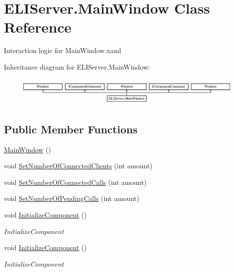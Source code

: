 \hypertarget{class_e_l_i_server_1_1_main_window}{}\section{E\+L\+I\+Server.\+Main\+Window Class Reference}
\label{class_e_l_i_server_1_1_main_window}


Interaction logic for Main\+Window.\+xaml  


Inheritance diagram for E\+L\+I\+Server.\+Main\+Window\+:\begin{figure}[H]
\begin{center}
\leavevmode
\includegraphics[height=1.464052cm]{d4/da4/class_e_l_i_server_1_1_main_window}
\end{center}
\end{figure}
\subsection*{Public Member Functions}
\begin{DoxyCompactItemize}
\item 
\hyperlink{class_e_l_i_server_1_1_main_window_ae50bb438e117f698b08e123aac01202b}{Main\+Window} ()
\item 
void \hyperlink{class_e_l_i_server_1_1_main_window_a103118ab2c9111954bc71bdfb168a3b6}{Set\+Number\+Of\+Connected\+Clients} (int amount)
\item 
void \hyperlink{class_e_l_i_server_1_1_main_window_a3910e3bdac410230d13aa22194f5e866}{Set\+Number\+Of\+Connected\+Calls} (int amount)
\item 
void \hyperlink{class_e_l_i_server_1_1_main_window_a8240badcee2def96a0b76ab95ea35ac6}{Set\+Number\+Of\+Pending\+Calls} (int amount)
\item 
void \hyperlink{class_e_l_i_server_1_1_main_window_a875637e4f56cfe224a61ef220213e1a0}{Initialize\+Component} ()
\begin{DoxyCompactList}\small\item\em Initialize\+Component \end{DoxyCompactList}\item 
void \hyperlink{class_e_l_i_server_1_1_main_window_a875637e4f56cfe224a61ef220213e1a0}{Initialize\+Component} ()
\begin{DoxyCompactList}\small\item\em Initialize\+Component \end{DoxyCompactList}\end{DoxyCompactItemize}
